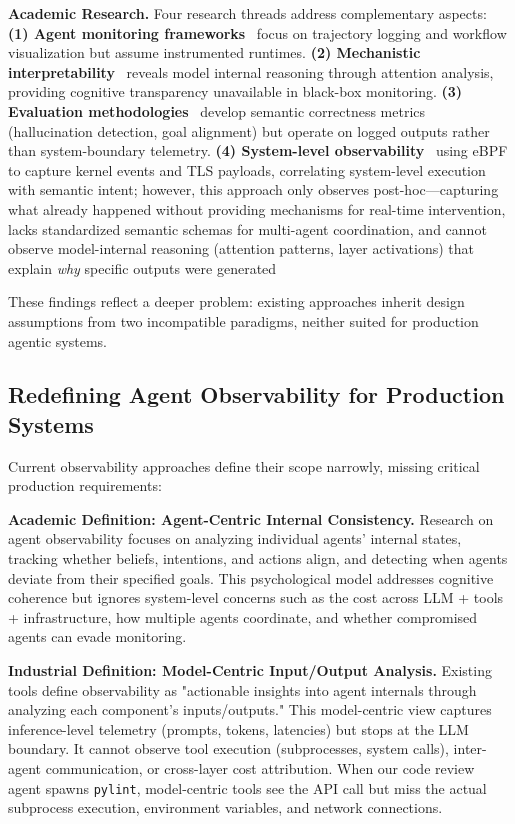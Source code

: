 \documentclass[sigplan,screen,9pt]{acmart}
\begin{document}
\textbf{Academic Research.} Four research threads address complementary aspects: \textbf{(1) Agent monitoring frameworks}~\cite{Rombaut2025Watson,Dong2024AgentOps} focus on trajectory logging and workflow visualization but assume instrumented runtimes. \textbf{(2) Mechanistic interpretability}~\cite{Kim2025AgenticInterp} reveals model internal reasoning through attention analysis, providing cognitive transparency unavailable in black-box monitoring. \textbf{(3) Evaluation methodologies}~\cite{Moshkovich2025Pipeline} develop semantic correctness metrics (hallucination detection, goal alignment) but operate on logged outputs rather than system-boundary telemetry. \textbf{(4) System-level observability}~\cite{zheng2025agentsight} using eBPF to capture kernel events and TLS payloads, correlating system-level execution with semantic intent; however, this approach only observes post-hoc—capturing what already happened without providing mechanisms for real-time intervention, lacks standardized semantic schemas for multi-agent coordination, and cannot observe model-internal reasoning (attention patterns, layer activations) that explain \emph{why} specific outputs were generated

These findings reflect a deeper problem: existing approaches inherit design assumptions from two incompatible paradigms, neither suited for production agentic systems.

\subsection{Redefining Agent Observability for Production Systems}

Current observability approaches define their scope narrowly, missing critical production requirements:

\textbf{Academic Definition: Agent-Centric Internal Consistency.} Research on agent observability focuses on analyzing individual agents' internal states, tracking whether beliefs, intentions, and actions align, and detecting when agents deviate from their specified goals. This psychological model addresses cognitive coherence but ignores system-level concerns such as the cost across LLM + tools + infrastructure, how multiple agents coordinate, and whether compromised agents can evade monitoring.

\textbf{Industrial Definition: Model-Centric Input/Output Analysis.} Existing tools define observability as "actionable insights into agent internals through analyzing each component's inputs/outputs." This model-centric view captures inference-level telemetry (prompts, tokens, latencies) but stops at the LLM boundary. It cannot observe tool execution (subprocesses, system calls), inter-agent communication, or cross-layer cost attribution. When our code review agent spawns \texttt{pylint}, model-centric tools see the API call but miss the actual subprocess execution, environment variables, and network connections.
\end{document}
